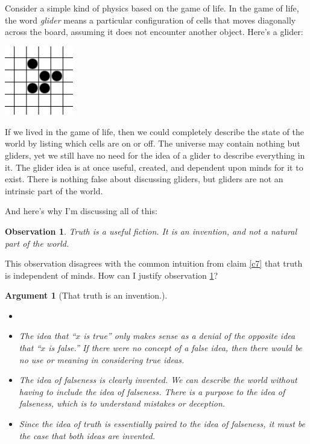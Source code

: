 \documentclass[11pt, oneside]{article}   	%
\newtheorem{obs}{Observation}
\newtheorem{argt}{Argument}
\begin{document}
Consider a simple kind of physics based on the game of life.
In the game of life, the word {\em glider} means a particular 
configuration of cells that moves diagonally across the board, assuming it does
not encounter another object. Here's a glider:
\begin{center}
\includegraphics[height=3cm]{glider.png}
\end{center}
If we lived in the game of life, then we could completely describe the state of
the world by listing which cells are on or off.
The universe may contain nothing but gliders, yet we still have no need
for the idea of a glider to describe everything in it.
The glider idea is at once useful, created, and dependent upon minds for it to
exist.
There is nothing false about discussing gliders, but gliders are not an
intrinsic part of the world.

And here's why I'm discussing all of this:
\begin{obs}\label{o3}
    Truth is a useful fiction. It is an invention, and not a natural part of the
    world.
\end{obs}

This observation disagrees with the common intuition from claim \ref{c7} that
truth is independent of minds. How can I justify observation \ref{o3}?

\begin{argt}[That truth is an invention.]
    \normalfont
    \begin{itemize}
        \item[]
        \item
    The idea that ``$x$ is true'' only makes sense as a denial of the opposite
    idea that ``$x$ is false.'' If there were no concept of a false idea, then
            there would be no use or meaning in considering true ideas.
        \item
            The idea of falseness is clearly invented. We can describe
            the world without having to include the idea of falseness.
            There is a purpose to the idea of falseness, which is to understand
            mistakes or deception.
        \item
            Since the idea of truth is essentially paired to the idea of
            falseness,
            it must be the case that both ideas are invented.
    \end{itemize}
\end{argt}
\end{document}
